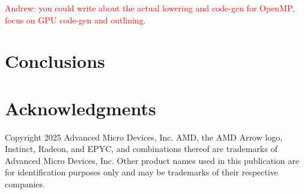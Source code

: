 \documentclass[acmtog,natbib=false]{acmart}
\newcommand{\todo}[1]{\textcolor{red}{#1}}
\begin{document}
\todo{Andrew: you could write about the actual lowering and code-gen for OpenMP, focus on GPU code-gen and outlining.}



\section{Conclusions}
\label{sec:Conclusions}



\section*{Acknowledgments}
Copyright 2025 Advanced Micro Devices, Inc.
AMD, the AMD Arrow logo, Instinct, Radeon, and EPYC, and combinations thereof are trademarks of Advanced Micro Devices, Inc.
Other product names used in this publication are for identification purposes only and may be trademarks of their respective companies.

\printbibliography
\end{document}
